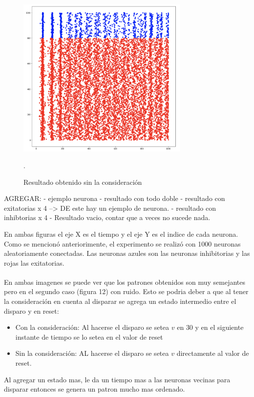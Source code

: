 \documentclass[12pt]{article}
\begin{document}
\begin{figure}[h!]
    \centering
        \includegraphics[height=8cm]{images/resultadoSinNorm.png}
    \caption[fontsize=2pt]{Resultado obtenido sin la consideración}.
\end{figure}

\newpage

AGREGAR:
- ejemplo neurona
- resultado con todo doble
- resultado con exitatorias x 4 --> DE este hay un ejemplo de neurona.
- resultado con inhibtorias x 4
- Resultado vacio, contar que a veces no sucede nada.

En ambas figuras el eje X es el tiempo y el eje Y es el indice de cada neurona. Como se mencionó anteriorimente, el experimento se realizó con 1000 neuronas aleatoriamente conectadas.
Las neuronas azules son las neuronas inhibitorias y las rojas las exitatorias. \\ \\

En ambas imagenes se puede ver que los patrones obtenidos son muy semejantes pero en el segundo caso (figura 12) con ruido.
Esto se podria deber a que al tener la consideración en cuenta al disparar se agrega un estado intermedio entre el disparo y en reset:
\begin{itemize}
    \item Con la consideración: Al hacerse el disparo se setea $v$ en $30$ y en el siguiente instante de tiempo se lo setea en el valor de reset
    \item Sin la consideración: AL hacerse el disparo se setea $v$ directamente al valor de reset.
\end{itemize}

Al agregar un estado mas, le da un tiempo mas a las neuronas vecinas para disparar entonces se genera un patron mucho mas ordenado. \\
\end{document}
